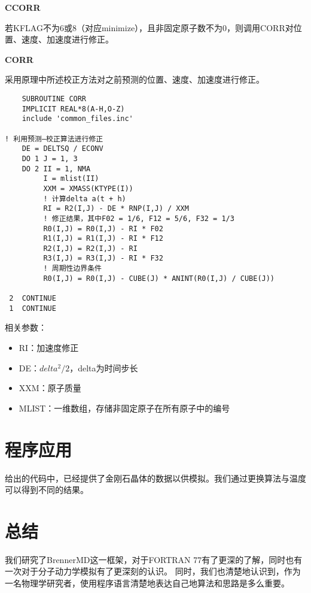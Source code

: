 \documentclass[UTF-8]{ctexart}
\begin{document}
\noindent
\textbf{CCORR}

若KFLAG不为6或8（对应minimize），且非固定原子数不为0，则调用CORR对位置、速度、加速度进行修正。

\noindent
\textbf{CORR}

采用原理中所述校正方法对之前预测的位置、速度、加速度进行修正。

\begin{verbatim}
    SUBROUTINE CORR
    IMPLICIT REAL*8(A-H,O-Z)
    include 'common_files.inc'

! 利用预测—校正算法进行修正
    DE = DELTSQ / ECONV
    DO 1 J = 1, 3
    DO 2 II = 1, NMA
         I = mlist(II)
         XXM = XMASS(KTYPE(I))
         ! 计算delta a(t + h)
         RI = R2(I,J) - DE * RNP(I,J) / XXM
         ! 修正结果，其中F02 = 1/6, F12 = 5/6, F32 = 1/3
         R0(I,J) = R0(I,J) - RI * F02
         R1(I,J) = R1(I,J) - RI * F12
         R2(I,J) = R2(I,J) - RI
         R3(I,J) = R3(I,J) - RI * F32
         ! 周期性边界条件
         R0(I,J) = R0(I,J) - CUBE(J) * ANINT(R0(I,J) / CUBE(J))

 2  CONTINUE
 1  CONTINUE
\end{verbatim}

\noindent
相关参数：
\begin{itemize}
    \item RI：加速度修正
    \item DE：$delta ^ 2 / 2$，delta为时间步长
    \item XXM：原子质量
    \item MLIST：一维数组，存储非固定原子在所有原子中的编号
\end{itemize}
















\section{程序应用}
给出的代码中，已经提供了金刚石晶体的数据以供模拟。我们通过更换算法与温度可以得到不同的结果。

\section{总结}
我们研究了BrennerMD这一框架，对于FORTRAN 77有了更深的了解，同时也有一次对于分子动力学模拟有了更深刻的认识。
同时，我们也清楚地认识到，作为一名物理学研究者，使用程序语言清楚地表达自己地算法和思路是多么重要。
\end{document}
